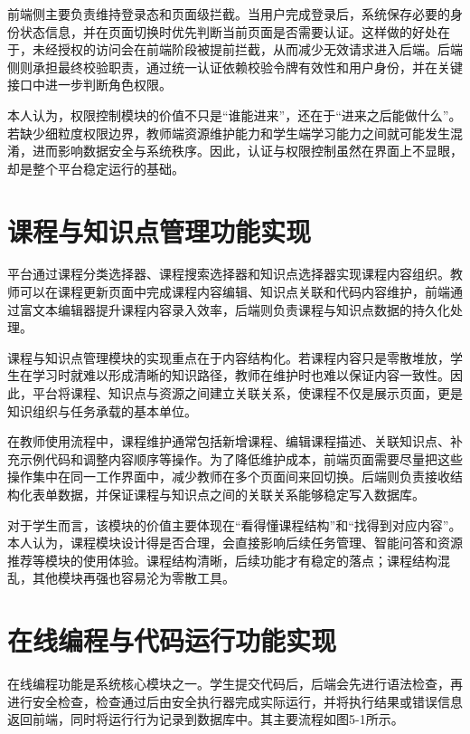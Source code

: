 前端侧主要负责维持登录态和页面级拦截。当用户完成登录后，系统保存必要的身份状态信息，并在页面切换时优先判断当前页面是否需要认证。这样做的好处在于，未经授权的访问会在前端阶段被提前拦截，从而减少无效请求进入后端。后端侧则承担最终校验职责，通过统一认证依赖校验令牌有效性和用户身份，并在关键接口中进一步判断角色权限。

本人认为，权限控制模块的价值不只是``谁能进来''，还在于``进来之后能做什么''。若缺少细粒度权限边界，教师端资源维护能力和学生端学习能力之间就可能发生混淆，进而影响数据安全与系统秩序。因此，认证与权限控制虽然在界面上不显眼，却是整个平台稳定运行的基础。

\section{课程与知识点管理功能实现}\label{ux8bfeux7a0bux4e0eux77e5ux8bc6ux70b9ux7ba1ux7406ux529fux80fdux5b9eux73b0}

平台通过课程分类选择器、课程搜索选择器和知识点选择器实现课程内容组织。教师可以在课程更新页面中完成课程内容编辑、知识点关联和代码内容维护，前端通过富文本编辑器提升课程内容录入效率，后端则负责课程与知识点数据的持久化处理。

课程与知识点管理模块的实现重点在于内容结构化。若课程内容只是零散堆放，学生在学习时就难以形成清晰的知识路径，教师在维护时也难以保证内容一致性。因此，平台将课程、知识点与资源之间建立关联关系，使课程不仅是展示页面，更是知识组织与任务承载的基本单位。

在教师使用流程中，课程维护通常包括新增课程、编辑课程描述、关联知识点、补充示例代码和调整内容顺序等操作。为了降低维护成本，前端页面需要尽量把这些操作集中在同一工作界面中，减少教师在多个页面间来回切换。后端则负责接收结构化表单数据，并保证课程与知识点之间的关联关系能够稳定写入数据库。

对于学生而言，该模块的价值主要体现在``看得懂课程结构''和``找得到对应内容''。本人认为，课程模块设计得是否合理，会直接影响后续任务管理、智能问答和资源推荐等模块的使用体验。课程结构清晰，后续功能才有稳定的落点；课程结构混乱，其他模块再强也容易沦为零散工具。

\section{在线编程与代码运行功能实现}\label{ux5728ux7ebfux7f16ux7a0bux4e0eux4ee3ux7801ux8fd0ux884cux529fux80fdux5b9eux73b0}

在线编程功能是系统核心模块之一。学生提交代码后，后端会先进行语法检查，再进行安全检查，检查通过后由安全执行器完成实际运行，并将执行结果或错误信息返回前端，同时将运行行为记录到数据库中。其主要流程如图5-1所示。

